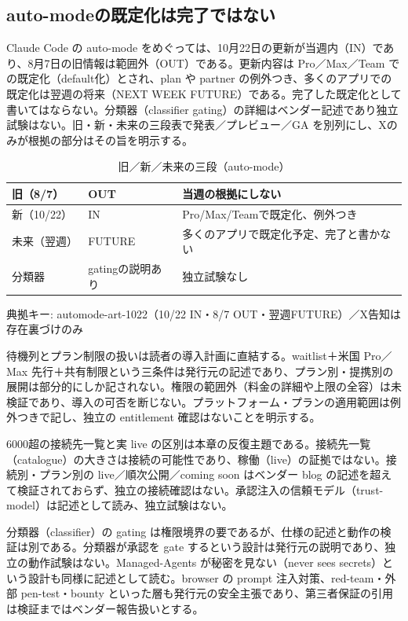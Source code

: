 \documentclass[lualatex,a4paper,10pt]{jlreq}
\begin{document}
\subsection*{auto-modeの既定化は完了ではない}


Claude Code の auto-mode をめぐっては、10月22日の更新が当週内（IN）であり、8月7日の旧情報は範囲外（OUT）である。更新内容は Pro／Max／Team での既定化（default化）とされ、plan や partner の例外つき、多くのアプリでの既定化は翌週の将来（NEXT WEEK FUTURE）である。完了した既定化として書いてはならない。分類器（classifier gating）の詳細はベンダー記述であり独立試験はない。旧・新・未来の三段表で発表／プレビュー／GA を別列にし、Xのみが根拠の部分はその旨を明示する。


\begin{table}[htbp]\centering\footnotesize
\caption{旧／新／未来の三段（auto-mode）}
\begin{tabularx}{0.96\linewidth}{@{}lXX@{}}
\toprule
旧（8/7） & OUT & 当週の根拠にしない \\
\midrule
新（10/22） & IN & Pro/Max/Teamで既定化、例外つき \\
未来（翌週） & FUTURE & 多くのアプリで既定化予定、完了と書かない \\
分類器 & gatingの説明あり & 独立試験なし \\
\bottomrule
\end{tabularx}
{\scriptsize\color{SurveyMuted} 典拠キー: automode-art-1022（10/22 IN・8/7 OUT・翌週FUTURE）／X告知は存在裏づけのみ\par}
\end{table}


待機列とプラン制限の扱いは読者の導入計画に直結する。waitlist＋米国 Pro／Max 先行＋共有制限という三条件は発行元の記述であり、プラン別・提携別の展開は部分的にしか記されない。権限の範囲外（料金の詳細や上限の全容）は未検証であり、導入の可否を断じない。プラットフォーム・プランの適用範囲は例外つきで記し、独立の entitlement 確認はないことを明示する。


6000超の接続先一覧と実 live の区別は本章の反復主題である。接続先一覧（catalogue）の大きさは接続の可能性であり、稼働（live）の証拠ではない。接続別・プラン別の live／順次公開／coming soon はベンダー blog の記述を超えて検証されておらず、独立の接続確認はない。承認注入の信頼モデル（trust-model）は記述として読み、独立試験はない。


分類器（classifier）の gating は権限境界の要であるが、仕様の記述と動作の検証は別である。分類器が承認を gate するという設計は発行元の説明であり、独立の動作試験はない。Managed-Agents が秘密を見ない（never sees secrets）という設計も同様に記述として読む。browser の prompt 注入対策、red-team・外部 pen-test・bounty といった層も発行元の安全主張であり、第三者保証の引用は検証まではベンダー報告扱いとする。
\end{document}
